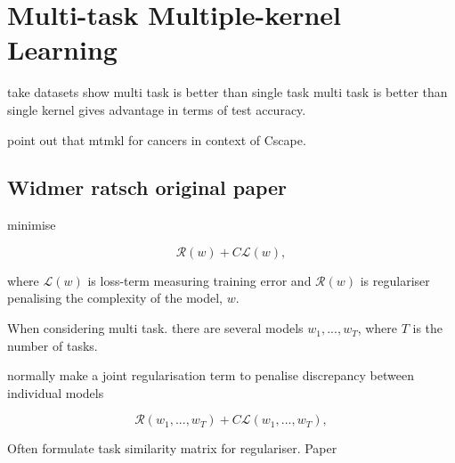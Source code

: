 \section{Multi-task Multiple-kernel Learning}

take datasets show multi task is better than single task
multi task is better than single kernel
gives advantage in terms of test accuracy.

point out that mtmkl for cancers in context of Cscape.



\subsection{Widmer ratsch original paper}

minimise

\begin{equation}
	\mathcal{R}(w) + C \mathcal{L}(w),
\end{equation}

where \(\mathcal{L}(w)\) is loss-term measuring training error and
\(\mathcal{R}(w)\) is regulariser penalising the complexity of the model, \(w\).

When considering multi task. there are several models \(w_1,...,w_T\), where \(T\) is the number of tasks.

normally make a joint regularisation term to penalise discrepancy between individual models

\begin{equation}
	\mathcal{R}(w_1,...,w_T) + C \mathcal{L}(w_1,...,w_T),
\end{equation}

Often formulate task similarity matrix for regulariser.
Paper 